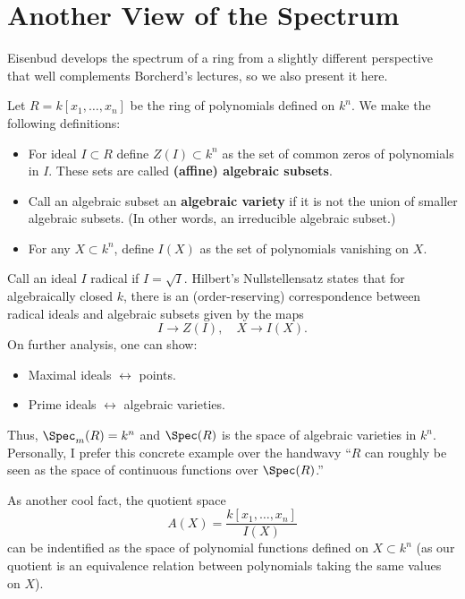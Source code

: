 \section{Another View of the Spectrum}

Eisenbud develops the spectrum of a ring from a slightly different perspective that well complements Borcherd's lectures, so we also present it here.

Let $R = k[x_1, \dots, x_n]$ be the ring of polynomials defined on $k^n$. We make the following definitions:
\begin{itemize}
    \item For ideal $I \subset R$ define $Z(I) \subset k^n$ as the set of common zeros of polynomials in $I$. These sets are called \textbf{(affine) algebraic subsets}.
    \item Call an algebraic subset an \textbf{algebraic variety} if it is not the union of smaller algebraic subsets. (In other words, an irreducible algebraic subset.)
    \item For any $X \subset k^n$, define $I(X)$ as the set of polynomials vanishing on $X$.
\end{itemize}
Call an ideal $I$ radical if $I = \sqrt{I}$. Hilbert's Nullstellensatz states that for algebraically closed $k$, there is an (order-reserving) correspondence between radical ideals and algebraic subsets given by the maps
\[
    I \to Z(I), \quad X \to I(X).
\]
On further analysis, one can show:
\begin{itemize}
    \item Maximal ideals $\leftrightarrow$ points.
    \item Prime ideals $\leftrightarrow$ algebraic varieties.
\end{itemize}
Thus, $\Spec_m(R) = k^n$ and $\Spec(R)$ is the space of algebraic varieties in $k^n$. Personally, I prefer this concrete example over the handwavy ``$R$ can roughly be seen as the space of continuous functions over $\Spec(R)$.''

As another cool fact, the quotient space
\[
    A(X) = \frac{k[x_1, \dots, x_n]}{I(X)}
\]
can be indentified as the space of polynomial functions defined on $X \subset k^n$ (as our quotient is an equivalence relation between polynomials taking the same values on $X$).


